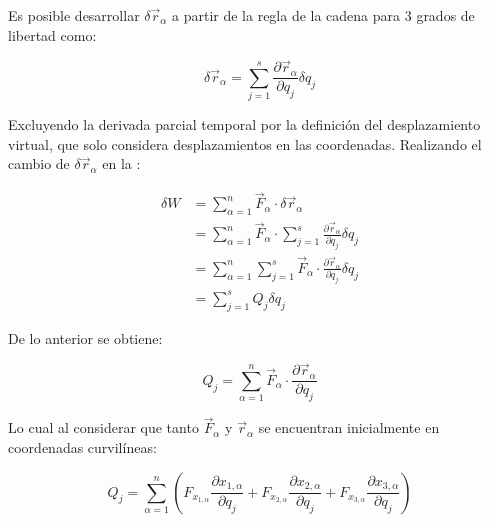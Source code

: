 \documentclass[/home/hernan-barquero/Documents/Apuntes_mecanica_teorica/main.tex]{subfiles}
\begin{document}
    Es posible desarrollar $ \delta \vec{r}_{\alpha}$ a partir de la regla de la cadena para $3$ grados de libertad como:

    \begin{equation*}
        \delta \vec{r}_{\alpha} = \sum_{j=1}^{s} \frac{\partial \vec{r}_{\alpha}}{\partial q_{j}} \delta q_{j}
    \end{equation*}

    Excluyendo la derivada parcial temporal por la definición del desplazamiento virtual, que solo considera desplazamientos en las coordenadas. Realizando el cambio de $\delta \vec{r}_{\alpha}$  en la :

    \begin{align*}
        \delta W & = \sum_{\alpha=1}^{n} \vec{F}_{\alpha}  \cdot \delta \vec{r}_{\alpha} \\ 
                & = \sum_{\alpha=1}^{n} \vec{F}_{\alpha}  \cdot \sum_{j=1}^{s} \frac{\partial \vec{r}_{\alpha}}{\partial q_{j}} \delta q_{j} \\ 
                & = \sum_{\alpha=1}^{n} \sum_{j=1}^{s} \vec{F}_{\alpha} \cdot \frac{\partial \vec{r}_{\alpha}}{\partial q_{j}} \delta q_{j} \\ 
                & = \sum_{j=1}^{s} Q_{j} \delta q_{j}
    \end{align*}

    De lo anterior se obtiene:

    \begin{equation*}
        Q_{j} = \sum_{\alpha=1}^{n} \vec{F}_{\alpha} \cdot \frac{\partial \vec{r}_{\alpha}}{\partial q_{j}} 
    \end{equation*}

    Lo cual al considerar que tanto $\vec{F}_{\alpha}$ y $\vec{r}_{\alpha}$ se encuentran inicialmente en coordenadas curvilíneas:

    \begin{equation*}
        Q_{j} = \sum_{\alpha=1}^{n} \left( F_{x_{1,\alpha}} \frac{\partial x_{1,\alpha}}{\partial q_{j}} +   F_{x_{2,\alpha}} \frac{\partial x_{2,\alpha}}{\partial q_{j}} + F_{x_{3,\alpha}} \frac{\partial x_{3,\alpha}}{\partial q_{j}} \right)
    \end{equation*}
\end{document}
